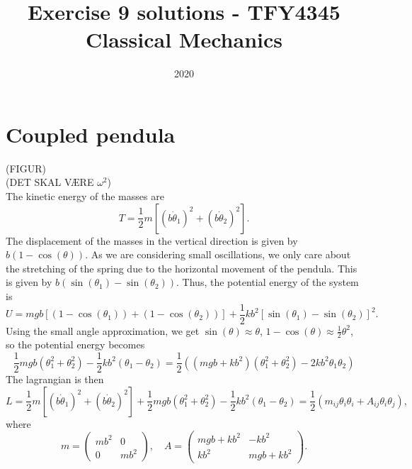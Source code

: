 \documentclass{article}
\title{Exercise 9 solutions - TFY4345 Classical Mechanics}
\date{2020}
\begin{document}
    \maketitle
    \section{Coupled pendula}
    (FIGUR) \\
    (DET SKAL VÆRE $\omega^2$) \\
    The kinetic energy of the masses are 
    \begin{equation*}
        T = \frac{1}{2}m\left[(b \dot \theta_1)^2 + (b \dot \theta_2)^2\right].
    \end{equation*}
    The displacement of the masses in the vertical direction is given by $b(1 - \cos(\theta))$. As we are considering small oscillations, we only care about the stretching of the spring due to the horizontal movement of the pendula. This is given by $b (\sin(\theta_1) - \sin(\theta_2))$. Thus, the potential energy of the system is
    \begin{equation*}
        U = mgb\left[(1 - \cos(\theta_1)) + (1 - \cos(\theta_2))\right] + \frac{1}{2}kb^2\left[\sin(\theta_1) - \sin(\theta_2)\right]^2.
    \end{equation*}
    Using the small angle approximation, we get $\sin(\theta) \approx \theta$, $1 - \cos(\theta) \approx \frac{1}{2} \theta^2$, so the potential energy becomes
    \begin{equation*}
        \frac{1}{2} mgb (\theta_1^2 + \theta_2^2) - \frac{1}{2}kb^2(\theta_1 - \theta_2) = \frac{1}{2}\left((mgb + kb^2)(\theta_1^2 + \theta_2^2) - 2kb^2 \theta_1 \theta_2\right)
    \end{equation*}
    The lagrangian is then
    \begin{equation*}
        L = \frac{1}{2}m\left[(b \dot \theta_1)^2 + (b \dot \theta_2)^2\right] + \frac{1}{2} mgb (\theta_1^2 + \theta_2^2) - \frac{1}{2}kb^2(\theta_1 - \theta_2)  = \frac{1}{2}\left(m_{ij}\theta_i \theta_i + A_{ij}\theta_i \theta_j\right),
    \end{equation*}
    where
    \begin{equation*}
        m = 
        \begin{pmatrix*}
            mb^2 & 0 \\
            0 & mb^2
        \end{pmatrix*}
        , \quad A = 
        \begin{pmatrix}
            mgb + kb^2 & -kb^2 \\
            kb^2 & mgb + kb^2
        \end{pmatrix}.
    \end{equation*}
\end{document}
